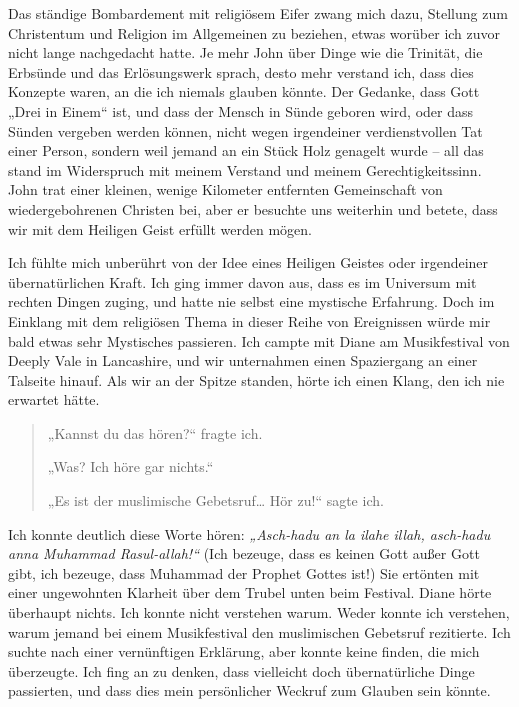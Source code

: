 \documentclass[12pt]{memoir}
\begin{document}
Das ständige Bombardement mit religiösem Eifer zwang mich dazu,
Stellung zum Christentum und Religion im Allgemeinen zu beziehen,
etwas worüber ich zuvor nicht lange nachgedacht hatte.
Je mehr John über Dinge wie die Trinität,
die Erbsünde und das Erlösungswerk sprach, desto mehr verstand ich,
dass dies Konzepte waren, an die ich niemals glauben könnte.
Der Gedanke, dass Gott „Drei in Einem“ ist,
und dass der Mensch in Sünde geboren wird,
oder dass Sünden vergeben werden können,
nicht wegen irgendeiner verdienstvollen Tat einer Person,
sondern weil jemand an ein Stück Holz genagelt wurde –
all das stand im Widerspruch mit meinem Verstand und meinem Gerechtigkeitssinn.
John trat einer kleinen,
wenige Kilometer entfernten Gemeinschaft von wiedergebohrenen Christen bei,
aber er besuchte uns weiterhin und betete,
dass wir mit dem Heiligen Geist erfüllt werden mögen.

Ich fühlte mich unberührt von der Idee eines Heiligen Geistes
oder irgendeiner übernatürlichen Kraft.
Ich ging immer davon aus, dass es im Universum mit rechten Dingen zuging,
und hatte nie selbst eine mystische Erfahrung.
Doch im Einklang mit dem religiösen Thema in dieser Reihe von Ereignissen
würde mir bald etwas sehr Mystisches passieren.
Ich campte mit Diane am Musikfestival von Deeply Vale in Lancashire,
und wir unternahmen einen Spaziergang an einer Talseite hinauf.
Als wir an der Spitze standen, hörte ich einen Klang,
den ich nie erwartet hätte.

\begin{quote}
„Kannst du das hören?“ fragte ich.

„Was? Ich höre gar nichts.“

„Es ist der muslimische Gebetsruf… Hör zu!“ sagte ich.
\end{quote}

Ich konnte deutlich diese Worte hören:
\emph{„Asch-hadu an la ilahe illah, asch-hadu anna Muhammad Rasul-allah!“}
(Ich bezeuge, dass es keinen Gott außer Gott gibt, ich bezeuge,
dass Muhammad der Prophet Gottes ist!)
Sie ertönten mit einer ungewohnten Klarheit
über dem Trubel unten beim Festival.
Diane hörte überhaupt nichts.
Ich konnte nicht verstehen warum.
Weder konnte ich verstehen, warum jemand bei einem Musikfestival
den muslimischen Gebetsruf rezitierte.
Ich suchte nach einer vernünftigen Erklärung, aber konnte keine finden,
die mich überzeugte.
Ich fing an zu denken, dass vielleicht doch übernatürliche Dinge passierten,
und dass dies mein persönlicher Weckruf zum Glauben sein könnte.
\end{document}
